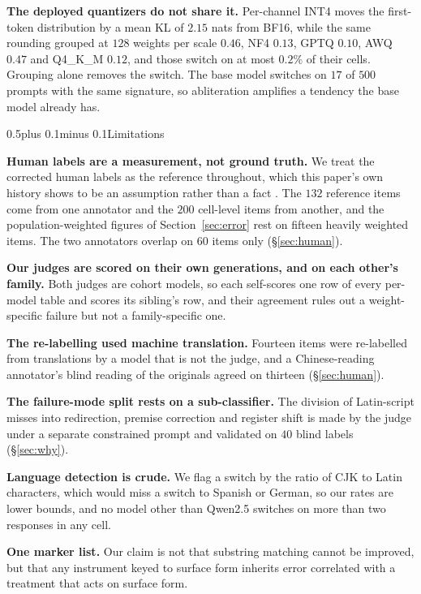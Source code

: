 \documentclass[conference,compsoc,letterpaper]{IEEEtran}
\makeatletter
\def\section{\@startsection{section}{1}{\z@}{1\baselineskip plus 0.25\baselineskip minus 0.25\baselineskip}%
{0.5\baselineskip plus 0.1\baselineskip minus 0.1\baselineskip}{\normalfont\large\bfseries}}%
\makeatother
\begin{document}
\textbf{The deployed quantizers do not share it.} Per-channel INT4 moves the
first-token distribution by a mean KL of $2.15$ nats from BF16, while the same rounding grouped at $128$ weights per scale $0.46$, NF4 $0.13$, GPTQ $0.10$,
AWQ $0.47$ and Q4\_K\_M $0.12$, and those switch on at most $0.2\%$ of their
cells. Grouping alone removes the switch. The base model switches on $17$ of
$500$ prompts with the same signature, so abliteration amplifies a tendency the
base model already has.

\section{Limitations}

\textbf{Human labels are a measurement, not ground truth.} We treat the corrected human labels as the reference throughout, which this paper's own history shows to be an assumption rather than a fact \cite{aroyo2015crowdtruth,plank2022variation}. The $132$ reference items come from one annotator and the $200$ cell-level items from another, and the population-weighted figures of Section~\ref{sec:error} rest on fifteen heavily weighted items. The two annotators overlap on $60$ items only (\S\ref{sec:human}).

\textbf{Our judges are scored on their own generations, and on each other's family.} Both judges are cohort models, so each self-scores one row of every per-model table and scores its sibling's row, and their agreement rules out a weight-specific failure but not a family-specific one.

\textbf{The re-labelling used machine translation.} Fourteen items were
re-labelled from translations by a model that is not the judge, and a Chinese-reading annotator's blind reading of the originals agreed on thirteen (\S\ref{sec:human}).

\textbf{The failure-mode split rests on a sub-classifier.} The division of
Latin-script misses into redirection, premise correction and register shift is
made by the judge under a separate constrained prompt and validated on $40$ blind labels (\S\ref{sec:why}).

\textbf{Language detection is crude.} We flag a
switch by the ratio of CJK to Latin characters, which would miss a switch to
Spanish or German, so our rates are lower bounds, and no model other than Qwen2.5 switches on more than two responses in any cell.

\textbf{One marker list.} Our claim is not that substring matching cannot be improved, but that any instrument keyed to surface form inherits error correlated with a treatment that acts on surface form.
\end{document}
